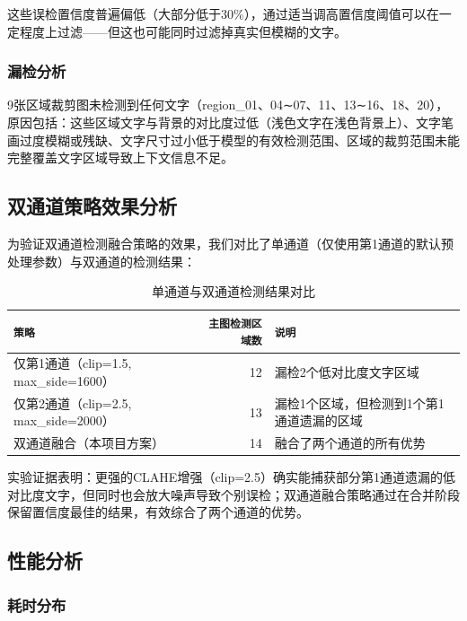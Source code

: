 \documentclass[12pt,hyperref,a4paper,UTF8]{ctexart}
\begin{document}
这些误检置信度普遍偏低（大部分低于30\%），通过适当调高置信度阈值可以在一定程度上过滤——但这也可能同时过滤掉真实但模糊的文字。

\subsubsection{漏检分析}

9张区域裁剪图未检测到任何文字（region\_01、04∼07、11、13∼16、18、20），原因包括：这些区域文字与背景的对比度过低（浅色文字在浅色背景上）、文字笔画过度模糊或残缺、文字尺寸过小低于模型的有效检测范围、区域的裁剪范围未能完整覆盖文字区域导致上下文信息不足。

\subsection{双通道策略效果分析}

为验证双通道检测融合策略的效果，我们对比了单通道（仅使用第1通道的默认预处理参数）与双通道的检测结果：

\begin{table}[!htbp]
    \centering
    \begin{tabular}{l|r|l}
        \hline
        \texttt{策略} & \texttt{主图检测区域数} & \texttt{说明} \\
        \hline
        仅第1通道（clip=1.5, max\_side=1600） & 12 & 漏检2个低对比度文字区域 \\
        仅第2通道（clip=2.5, max\_side=2000） & 13 & 漏检1个区域，但检测到1个第1通道遗漏的区域 \\
        双通道融合（本项目方案） & 14 & 融合了两个通道的所有优势 \\
        \hline
    \end{tabular}
    \caption{单通道与双通道检测结果对比}
    \label{tab:dual_compare}
\end{table}

实验证据表明：更强的CLAHE增强（clip=2.5）确实能捕获部分第1通道遗漏的低对比度文字，但同时也会放大噪声导致个别误检；双通道融合策略通过在合并阶段保留置信度最佳的结果，有效综合了两个通道的优势。

\subsection{性能分析}

\subsubsection{耗时分布}
\end{document}
